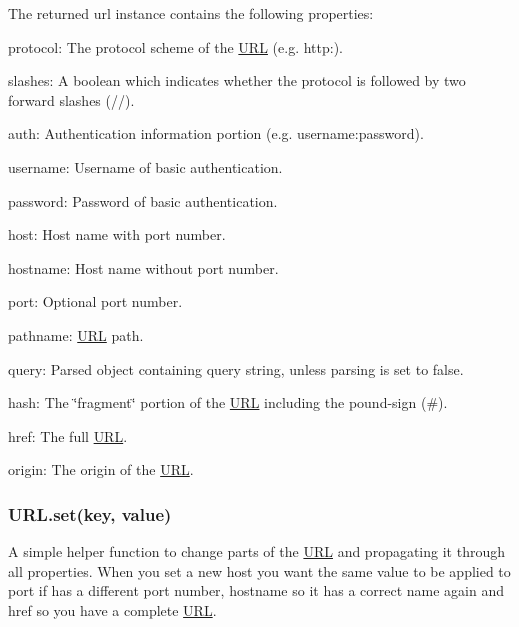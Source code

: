 The returned {\ttfamily url} instance contains the following properties\+:


\begin{DoxyItemize}
\item {\ttfamily protocol}\+: The protocol scheme of the \mbox{\hyperlink{namespace_u_r_l}{U\+RL}} (e.\+g. {\ttfamily http\+:}).
\item {\ttfamily slashes}\+: A boolean which indicates whether the {\ttfamily protocol} is followed by two forward slashes ({\ttfamily //}).
\item {\ttfamily auth}\+: Authentication information portion (e.\+g. {\ttfamily username\+:password}).
\item {\ttfamily username}\+: Username of basic authentication.
\item {\ttfamily password}\+: Password of basic authentication.
\item {\ttfamily host}\+: Host name with port number.
\item {\ttfamily hostname}\+: Host name without port number.
\item {\ttfamily port}\+: Optional port number.
\item {\ttfamily pathname}\+: \mbox{\hyperlink{namespace_u_r_l}{U\+RL}} path.
\item {\ttfamily query}\+: Parsed object containing query string, unless parsing is set to false.
\item {\ttfamily hash}\+: The \char`\"{}fragment\char`\"{} portion of the \mbox{\hyperlink{namespace_u_r_l}{U\+RL}} including the pound-\/sign ({\ttfamily \#}).
\item {\ttfamily href}\+: The full \mbox{\hyperlink{namespace_u_r_l}{U\+RL}}.
\item {\ttfamily origin}\+: The origin of the \mbox{\hyperlink{namespace_u_r_l}{U\+RL}}.
\end{DoxyItemize}

\subsubsection*{U\+R\+L.\+set(key, value)}

A simple helper function to change parts of the \mbox{\hyperlink{namespace_u_r_l}{U\+RL}} and propagating it through all properties. When you set a new {\ttfamily host} you want the same value to be applied to {\ttfamily port} if has a different port number, {\ttfamily hostname} so it has a correct name again and {\ttfamily href} so you have a complete \mbox{\hyperlink{namespace_u_r_l}{U\+RL}}.


